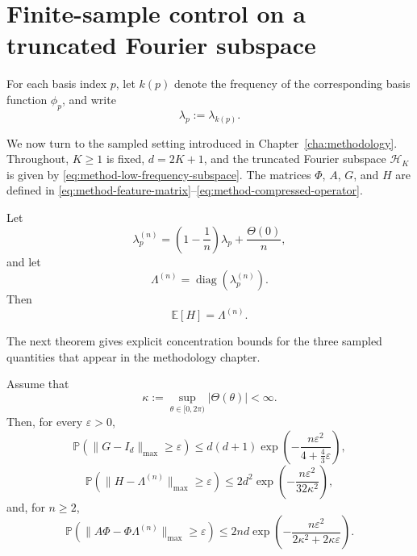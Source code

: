 \section{Finite-sample control on a truncated Fourier subspace}
\label{sec:results-finite-sample}

For each basis index \(p\), let \(k(p)\) denote the frequency of the corresponding basis
function \(\phi_p\), and write
\[
	\lambda_p:=\lambda_{k(p)}.
\]

We now turn to the sampled setting introduced in Chapter~\ref{cha:methodology}. Throughout,
\(K\geq 1\) is fixed, \(d=2K+1\), and the truncated Fourier subspace \(\mathcal H_K\) is given by
\eqref{eq:method-low-frequency-subspace}. The matrices \(\Phi\), \(A\), \(G\), and \(H\) are
defined in \eqref{eq:method-feature-matrix}--\eqref{eq:method-compressed-operator}.

\begin{proposition}
	\label{prop:results-expectation-H}
	Let
	\begin{equation}
		\lambda_p^{(n)}
		=
		\left(1-\frac{1}{n}\right)\lambda_p+\frac{\Theta(0)}{n},
		\label{eq:results-finite-sample-corrected-eigs}
	\end{equation}
	and let
	\begin{equation}
		\Lambda^{(n)}=\operatorname{diag}(\lambda_p^{(n)}).
		\label{eq:results-finite-sample-eigenvalue-matrix}
	\end{equation}
	Then
	\begin{equation}
		\mathbb E[H]=\Lambda^{(n)}.
		\label{eq:results-expected-H}
	\end{equation}
\end{proposition}

The next theorem gives explicit concentration bounds for the three sampled quantities that
appear in the methodology chapter.

\begin{theorem}
	\label{thm:results-finite-sample-concentration}
	Assume that
	\begin{equation}
		\kappa:=\sup_{\theta\in[0,2\pi)}|\Theta(\theta)|<\infty.
		\label{eq:results-kappa}
	\end{equation}
	Then, for every \(\varepsilon>0\),
	\begin{equation}
		\mathbb P\!\left(\|G-I_d\|_{\max}\ge \varepsilon\right)
		\le
		d(d+1)\exp\!\left(-\frac{n\varepsilon^2}{4+\frac43\varepsilon}\right),
		\label{eq:results-gram-concentration}
	\end{equation}
	\begin{equation}
		\mathbb P\!\left(\|H-\Lambda^{(n)}\|_{\max}\ge \varepsilon\right)
		\le
		2d^2\exp\!\left(-\frac{n\varepsilon^2}{32\kappa^2}\right),
		\label{eq:results-H-concentration}
	\end{equation}
	and, for \(n\ge 2\),
	\begin{equation}
		\mathbb P\!\left(\|A\Phi-\Phi\Lambda^{(n)}\|_{\max}\ge \varepsilon\right)
		\le
		2nd\exp\!\left(-\frac{n\varepsilon^2}{2\kappa^2+2\kappa\varepsilon}\right).
		\label{eq:results-APhi-concentration}
	\end{equation}
\end{theorem}

